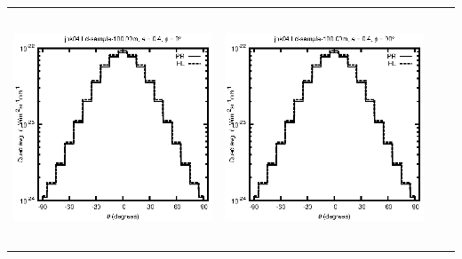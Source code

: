 \begin{tabular}{c c c c}
\includegraphics[height=7cm]{../eps/jok04_Ld_sample_100.00m_fwd.eps} &
\includegraphics[height=7cm]{../eps/jok04_Ld_sample_100.00m_cross.eps} \\
\end{tabular}

\pagebreak

